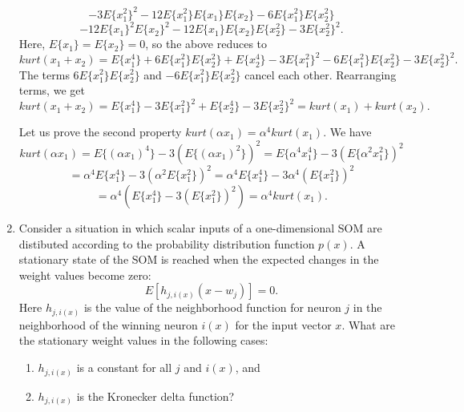 \documentclass[10pt]{article}
\begin{document}
\begin{enumerate}
\begin{displaymath}
   -3 E\{x_1^2\}^2 -12 E\{x_1^2\} E\{x_1\}E\{x_2\} -6 E\{x_1^2\} E\{x_2^2\}
  \end{displaymath}
  \begin{displaymath}
   -12 E\{x_1\}^2 E\{x_2\}^2 -12 E\{x_1\}E\{x_2\} E\{x_2^2\} -3 E\{x_2^2\}^2 .
  \end{displaymath}
  Here, $E\{x_1\}=E\{x_2\}=0$, so the above reduces to
  \begin{displaymath}
  kurt(x_1+x_2)
  = E\{x_1^4\} + 6 E\{x_1^2\}E\{x_2^2\}
  + E\{x_2^4\}
   -3 E\{x_1^2\}^2
   -6 E\{x_1^2\} E\{x_2^2\}  -3 E\{x_2^2\}^2 .
  \end{displaymath}
  The terms $6 E\{x_1^2\}E\{x_2^2\}$ and $-6 E\{x_1^2\}E\{x_2^2\}$ cancel each other.
  Rearranging terms, we get
  \begin{displaymath}
  kurt(x_1+x_2)
  = E\{x_1^4\} -3 E\{x_1^2\}^2 + E\{x_2^4\} -3 E\{x_2^2\}^2
  = kurt(x_1) + kurt(x_2) .
  \end{displaymath}

  Let us prove the second property $kurt(\alpha x_1) = \alpha^4 kurt(x_1)$.
  We have
  \begin{displaymath}
  kurt(\alpha x_1)
  = E\{(\alpha x_1)^4\} - 3(E\{(\alpha x_1)^2\})^2
  = E\{\alpha^4 x_1^4\} - 3(E\{\alpha^2 x_1^2\})^2
  \end{displaymath}
  \begin{displaymath}
  = \alpha^4 E\{x_1^4\} - 3(\alpha^2 E\{x_1^2\})^2
  = \alpha^4 E\{x_1^4\} - 3\alpha^4 (E\{x_1^2\})^2
  \end{displaymath}
  \begin{displaymath}
  = \alpha^4 (E\{x_1^4\} - 3(E\{x_1^2\})^2)
  = \alpha^4 kurt(x_1).
  \end{displaymath}



\vspace{2mm}

\vspace{2cm}
\item Consider a situation in which scalar inputs of a
one-dimensional SOM are distibuted according to the probability
distribution function $p(x)$. A stationary state
of the SOM is reached when the expected changes in the weight
values become zero:
\begin{equation*}
E[h_{j,i(x)}(x-w_j)]=0 \mbox{.}
\end{equation*}
Here $h_{j,i(x)}$ is the value of the neighborhood function for neuron $j$ in the neighborhood
of the winning neuron $i(x)$ for the input vector $x$.
What are the stationary weight values in the following cases: \begin{enumerate}
\item $h_{j,i(x)}$ is a constant for all $j$ and $i(x)$, and
\item $h_{j,i(x)}$ is the Kronecker delta function?
\end{enumerate}


\end{enumerate}
\end{document}
